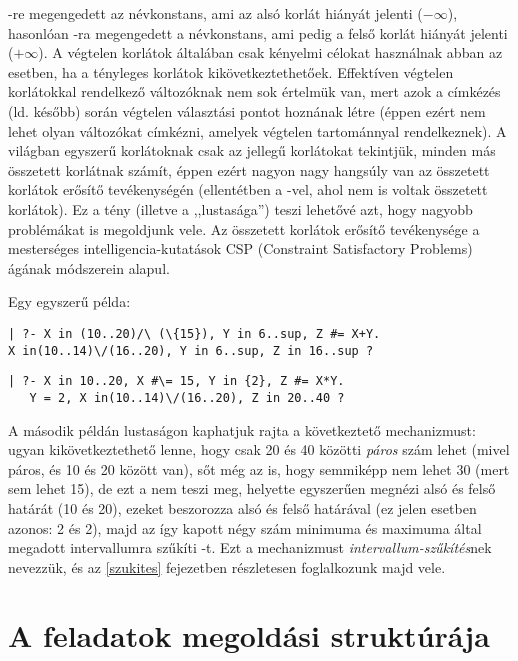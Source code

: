 -re megengedett az  névkonstans, ami az alsó korlát
hiányát jelenti ($-\infty$), hasonlóan -ra megengedett a 
névkonstans, ami pedig a felső korlát hiányát jelenti ($+\infty$). A végtelen
korlátok általában csak kényelmi célokat használnak abban az esetben, ha
a tényleges korlátok kikövetkeztethetőek. Effektíven végtelen korlátokkal
rendelkező változóknak nem sok értelmük van, mert azok a címkézés (ld. később)
során végtelen választási pontot hoznának létre (éppen ezért nem lehet olyan
változókat címkézni, amelyek végtelen tartománnyal rendelkeznek).
\br
A \clpfd világban egyszerű korlátoknak csak az 
jellegű korlátokat tekintjük, minden más összetett korlátnak számít, éppen
ezért nagyon nagy hangsúly van az összetett korlátok erősítő tevékenységén
(ellentétben a \Clpb -vel, ahol nem is voltak összetett korlátok). Ez a tény
(illetve a \clpfd ,,lustasága'') teszi lehetővé azt, hogy nagyobb problémákat
is megoldjunk vele. Az összetett korlátok erősítő tevékenysége a mesterséges
intelligencia-kutatások CSP (Constraint Satisfactory Problems) ágának
módszerein alapul.

Egy egyszerű \clpfd példa:

\begin{verbatim}
| ?- X in (10..20)/\ (\{15}), Y in 6..sup, Z #= X+Y.
X in(10..14)\/(16..20), Y in 6..sup, Z in 16..sup ? 
\end{verbatim}
\begin{verbatim}
| ?- X in 10..20, X #\= 15, Y in {2}, Z #= X*Y.
   Y = 2, X in(10..14)\/(16..20), Z in 20..40 ? 
\end{verbatim}

A második példán lustaságon kaphatjuk rajta a \clpfd következtető mechanizmust:
ugyan kikövetkeztethető lenne, hogy  csak 20 és 40 közötti \emph{páros}
szám lehet (mivel  páros, és  10 és 20 között van), sőt még
az is, hogy  semmiképp nem lehet 30 (mert  sem lehet 15),
de ezt a \clpfd nem teszi meg, helyette egyszerűen megnézi  alsó és
felső határát (10 és 20), ezeket beszorozza  alsó és felső határával
(ez jelen esetben azonos: 2 és 2), majd az így kapott négy szám minimuma és
maximuma által megadott intervallumra szűkíti -t. Ezt a mechanizmust
\emph{intervallum-szűkítés}nek nevezzük, és az \ref{szukites} fejezetben
részletesen foglalkozunk majd vele.

\section{A \clpfd feladatok megoldási struktúrája}

